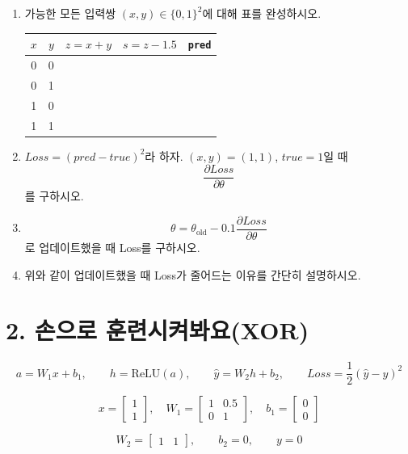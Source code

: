 \documentclass[11pt]{article}
\begin{document}
\begin{enumerate}
\item 가능한 모든 입력쌍 \((x,y)\in\{0,1\}^2\)에 대해 표를 완성하시오.

\begin{center}
\begin{tabular}{c c | c c c}
\hline
\(x\) & \(y\) & \(z=x+y\) & \(s=z-1.5\) & \texttt{pred} \\
\hline
0 & 0 & & & \\
0 & 1 & & & \\
1 & 0 & & & \\
1 & 1 & & & \\
\hline
\end{tabular}
\end{center}

\item \(Loss=(pred-true)^2\)라 하자. \((x,y)=(1,1)\), \(true=1\)일 때
\[
\frac{\partial Loss}{\partial \theta}
\]
를 구하시오.

\item
\[
\theta=\theta_{\mathrm{old}}-0.1\frac{\partial Loss}{\partial \theta}
\]
로 업데이트했을 때 Loss를 구하시오.

\item 위와 같이 업데이트했을 때 Loss가 줄어드는 이유를 간단히 설명하시오.
\end{enumerate}

\newpage

\section*{2. 손으로 훈련시켜봐요(XOR)}

\[
a=W_1x+b_1,\qquad
h=\mathrm{ReLU}(a),\qquad
\hat y=W_2h+b_2,\qquad
Loss=\frac12(\hat y-y)^2
\]

\[
x=
\begin{bmatrix}
1\\1
\end{bmatrix},\quad
W_1=
\begin{bmatrix}
1&0.5\\
0&1
\end{bmatrix},\quad
b_1=
\begin{bmatrix}
0\\0
\end{bmatrix}
\]

\[
W_2=
\begin{bmatrix}
1&1
\end{bmatrix},\qquad
b_2=0,\qquad
y=0
\]
\end{document}
